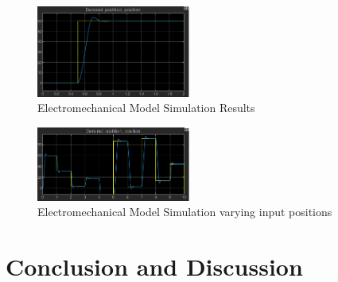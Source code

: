  
\begin{figure}[h]
 \centering
   \includegraphics[width = 0.45\textwidth]{figures/15.png}                \caption{Electromechanical Model Simulation Results}
   \label{fig:Electromechanical Model Simulation Results}
\end{figure}
\begin{figure}[h]
 \centering
   \includegraphics[width = 0.45\textwidth]{figures/16.png}                \caption{Electromechanical Model Simulation varying input positions}
   \label{fig:Electromechanical Model Simulation varying input positions}
\end{figure}








\section{Conclusion and Discussion}

